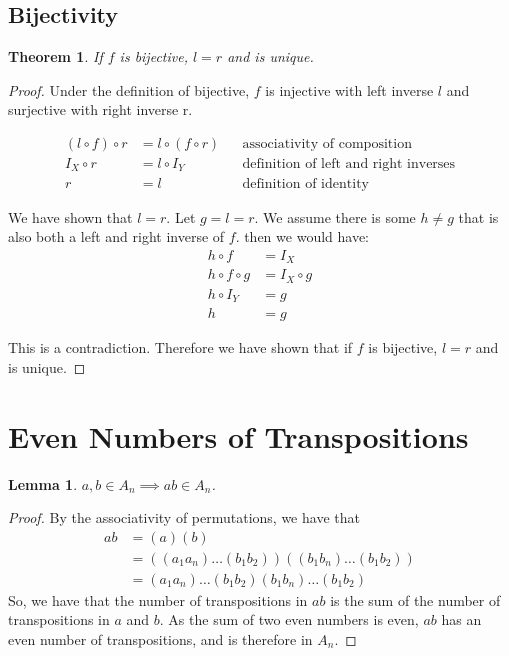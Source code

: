 \documentclass[12pt]{article}
\newtheorem{lemma}{Lemma}
\newtheorem{theorem}{Theorem}
\begin{document}
\subsection*{Bijectivity}
\begin{theorem}
If $f$ is bijective, $l = r$ and is unique.
\end{theorem}
\begin{proof}

Under the definition of bijective, $f$ is injective with left inverse $l$ and surjective with right inverse r.

\begin{align*}
(l \circ f) \circ r &= l \circ (f \circ r) & &\text{associativity of composition}\\
I_X \circ r &= l \circ I_Y & & \text{definition of left and right inverses}\\
r &= l & & \text{definition of identity}
\end{align*}

We have shown that $l = r$. Let $g = l = r$. We assume there is some $h \neq g$ that is also both a left and right inverse of $f$. then we would have:
\begin{align*}
h \circ f &= I_X\\
h \circ f \circ g &= I_X \circ g\\
h \circ I_Y &= g\\
h &= g
\end{align*}

This is a contradiction. Therefore we have shown that if $f$ is bijective, $l = r$ and is unique.
 
\end{proof}

\section{Even Numbers of Transpositions}

\begin{lemma}
$a,b \in A_n \implies ab \in A_n$.
\end{lemma}
\begin{proof}
By the associativity of permutations, we have that
\begin{align*}
ab &= (a)(b)\\
&= ((a_1 a_n)\ldots(b_1 b_2))((b_1 b_n)\ldots(b_1 b_2))\\
&= (a_1 a_n)\ldots(b_1 b_2)(b_1 b_n)\ldots(b_1 b_2)
\end{align*}
So, we have that the number of transpositions in $ab$ is the sum of the number of transpositions in $a$ and $b$. As the sum of two even numbers is even, $ab$ has an even number of transpositions, and is therefore in $A_n$. 
\end{proof}
\end{document}
